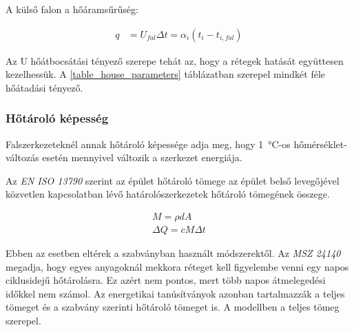 A külső falon a hőáramsűrűség:

\begin{equation}\label{eq_hoveszteseg}
\begin{aligned}
q &= U_{fal}\Delta t = \alpha_i\left(t_i-t_{i,fal}\right)
\end{aligned}
\end{equation}

Az U hőátbocsátási tényező szerepe tehát az, hogy a rétegek hatását együttesen kezelhessük. A \ref{table_house_parameters} táblázatban szerepel mindkét féle hőátadási tényező. 



\begin{table}[H]
	\footnotesize
	\centering
	\caption{Hőközlés fajtái}
	
	\label{tab:HeatExchangeTypes}
\end{table}

\subsubsection*{Hőtároló képesség}


Falszerkezeteknél annak hőtároló képessége adja meg, hogy \SI{1}{\celsius}-os hőmérséklet-változás esetén mennyivel változik a szerkezet energiája.

Az \textit{EN ISO 13790} szerint az épület hőtároló tömege az épület belső levegőjével közvetlen kapcsolatban lévő határolószerkezetek hőtároló tömegének összege.

\begin{equation}\label{eq_hotarolo-tomeg}
\begin{aligned}
M= \rho d A\\[10pt]
\Delta Q= cM\Delta t
\end{aligned}
\end{equation}

Ebben az esetben eltérek a szabványban használt módszerektől. Az \textit{MSZ 24140} megadja, hogy egyes anyagoknál mekkora réteget kell figyelembe venni egy napos ciklusidejű hőtárolásra. Ez azért nem pontos, mert több napos átmelegedési időkkel nem számol. Az energetikai tanúsítványok azonban tartalmazzák a teljes tömeget és a szabvány szerinti hőtároló tömeget is. A modellben a teljes tömeg szerepel.




